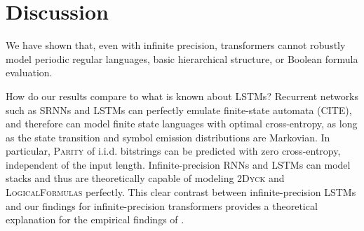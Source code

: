 \documentclass[11pt,a4paper]{article}
\begin{document}



\section{Discussion}

We have shown that, even with infinite precision, transformers cannot robustly model periodic regular languages, basic hierarchical structure, or Boolean formula evaluation.

How do our results compare to what is known about LSTMs?
Recurrent networks such as SRNNs and LSTMs can perfectly emulate finite-state automata (CITE), and therefore can model finite state languages with optimal cross-entropy, as long as the state transition and symbol emission distributions are Markovian.
In particular, \textsc{Parity} of i.i.d. bitstrings can be predicted with zero cross-entropy, independent of the input length.
Infinite-precision RNNs and LSTMs can model stacks \cite{kirov2012processing} and thus are theoretically capable of modeling \textsc{2Dyck} and \textsc{LogicalFormulas} perfectly.
This clear contrast between infinite-precision LSTMs and our findings for infinite-precision transformers provides a theoretical explanation for the empirical findings of \cite{tran2018importance}.





\end{document}

